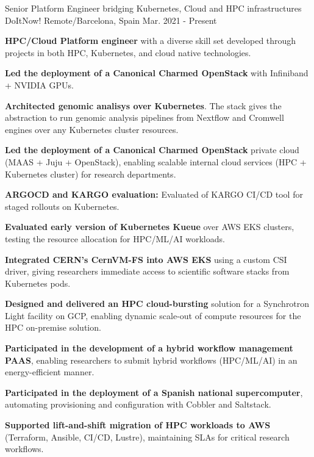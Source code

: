 
\begin{cventries}

\cventry
{Senior Platform Engineer bridging Kubernetes, Cloud and HPC infrastructures} %
{DoItNow!} %
{Remote/Barcelona, Spain} %
{Mar. 2021 - Present} %
{ %
	\begin{cvitems}
		\item{ \textbf{HPC/Cloud Platform engineer} with a diverse skill set developed through projects in both HPC, Kubernetes, and cloud native technologies.}
        \item{\textbf{Led the deployment of a Canonical Charmed OpenStack} with Infiniband + NVIDIA GPUs.}
        \item{\textbf{Architected genomic analisys over Kubernetes}. The stack gives the abstraction to run genomic analysis pipelines from Nextflow and Cromwell engines over any Kubernetes cluster resources.}
		\item{\textbf{Led the deployment of a Canonical Charmed OpenStack} private cloud (MAAS + Juju + OpenStack), enabling scalable internal cloud services (HPC + Kubernetes cluster) for research departments.}
        \item{\textbf{ARGOCD and KARGO evaluation:} Evaluated of KARGO CI/CD tool for staged rollouts on Kubernetes.}
        \item{\textbf{Evaluated early version of Kubernetes Kueue} over AWS EKS clusters, testing the resource allocation for HPC/ML/AI workloads.}
        \item{\textbf{Integrated CERN's CernVM-FS into AWS EKS} using a custom CSI driver, giving researchers immediate access to scientific software stacks from Kubernetes pods.}
        \item{\textbf{Designed and delivered an HPC cloud-bursting} solution for a Synchrotron Light facility on GCP, enabling dynamic scale-out of compute resources for the HPC on-premise solution.}
        \item{\textbf{Participated in the development of a hybrid workflow management PAAS}, enabling researchers to submit hybrid workflows (HPC/ML/AI) in an energy-efficient manner.}
        \item{\textbf{Participated in the deployment of a Spanish national supercomputer}, automating provisioning and configuration with Cobbler and Saltstack.}
        \item{\textbf{Supported lift-and-shift migration of HPC workloads to AWS} (Terraform, Ansible, CI/CD, Lustre), maintaining SLAs for critical research workflows.}
	\end{cvitems}
}


\end{cventries}
